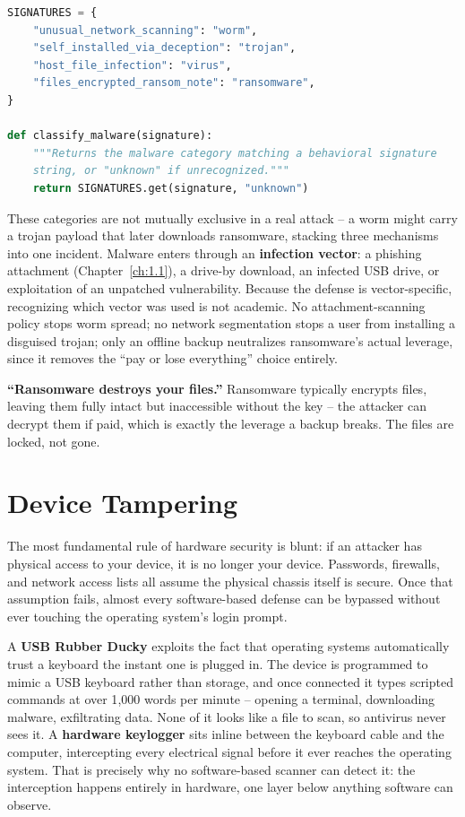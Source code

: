 \begin{lstlisting}[language=Python, caption={Classifying an infection by its behavioral signature}]
SIGNATURES = {
    "unusual_network_scanning": "worm",
    "self_installed_via_deception": "trojan",
    "host_file_infection": "virus",
    "files_encrypted_ransom_note": "ransomware",
}

def classify_malware(signature):
    """Returns the malware category matching a behavioral signature
    string, or "unknown" if unrecognized."""
    return SIGNATURES.get(signature, "unknown")
\end{lstlisting}

These categories are not mutually exclusive in a real attack -- a worm might carry a trojan
payload that later downloads ransomware, stacking three mechanisms into one incident. Malware
enters through an \textbf{infection vector}: a phishing attachment (Chapter~\ref{ch:1.1}), a
drive-by download, an infected USB drive, or exploitation of an unpatched vulnerability. Because
the defense is vector-specific, recognizing which vector was used is not academic. No
attachment-scanning policy stops worm spread; no network segmentation stops a user from installing
a disguised trojan; only an offline backup neutralizes ransomware's actual leverage, since it
removes the ``pay or lose everything'' choice entirely.

\begin{misconception}
\textbf{``Ransomware destroys your files.''} Ransomware typically encrypts files, leaving them
fully intact but inaccessible without the key -- the attacker can decrypt them if paid, which is
exactly the leverage a backup breaks. The files are locked, not gone.
\end{misconception}

\section{Device Tampering}

The most fundamental rule of hardware security is blunt: if an attacker has physical access to
your device, it is no longer your device. Passwords, firewalls, and network access lists all
assume the physical chassis itself is secure. Once that assumption fails, almost every
software-based defense can be bypassed without ever touching the operating system's login prompt.

A \textbf{USB Rubber Ducky} exploits the fact that operating systems automatically trust a
keyboard the instant one is plugged in. The device is programmed to mimic a USB keyboard rather
than storage, and once connected it types scripted commands at over 1{,}000 words per
minute -- opening a terminal, downloading malware, exfiltrating data. None of it
looks like a file to scan, so antivirus never sees it. A \textbf{hardware keylogger} sits inline
between the keyboard cable and the computer, intercepting every electrical signal before it ever
reaches the operating system. That is precisely why no software-based scanner can detect it: the
interception happens entirely in hardware, one layer below anything software can observe.

